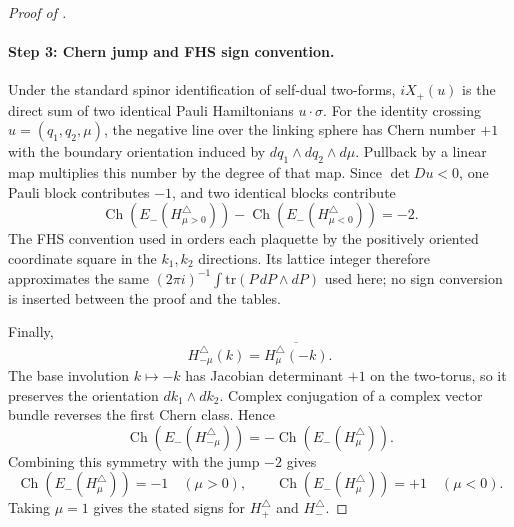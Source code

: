 \documentclass[11pt]{article}
\numberwithin{equation}{section}
\theoremstyle{definition}
\theoremstyle{remark}
\newcommand{\tr}{\mathrm{tr}}
\newcommand{\Ch}{\operatorname{Ch}}
\begin{document}
\begin{proof}[Proof of ]
\paragraph{Step 3: Chern jump and FHS sign convention.}
Under the standard spinor identification of self-dual two-forms, \(iX_+(u)\) is the direct sum of
two identical Pauli Hamiltonians \(u\cdot\sigma\). For the identity crossing
\(u=(q_1,q_2,\mu)\), the negative line over the linking sphere has Chern number \(+1\) with the
boundary orientation induced by \(dq_1\wedge dq_2\wedge d\mu\). Pullback by a linear map multiplies
this number by the degree of that map. Since \(\det Du<0\), one Pauli block contributes \(-1\), and
two identical blocks contribute
\[
\Ch(E_-(H^\triangle_{\mu>0}))-\Ch(E_-(H^\triangle_{\mu<0}))=-2.
\]
The FHS convention used in
 orders each
plaquette by the positively oriented coordinate square in the \(k_1,k_2\) directions. Its lattice
integer therefore approximates the same
\((2\pi i)^{-1}\int\tr(P\,dP\wedge dP)\) used here; no sign conversion is inserted between the
proof and the tables.

Finally,
\[
H^\triangle_{-\mu}(k)=\overline{H^\triangle_{\mu}(-k)}.
\]
The base involution \(k\mapsto-k\) has Jacobian determinant \(+1\) on the two-torus, so it preserves
the orientation \(dk_1\wedge dk_2\). Complex conjugation of a complex vector bundle reverses the
first Chern class. Hence
\[
\Ch(E_-(H^\triangle_{-\mu}))=-\Ch(E_-(H^\triangle_{\mu})).
\]
Combining this symmetry with the jump \(-2\) gives
\[
\Ch(E_-(H^\triangle_{\mu}))=-1\quad(\mu>0),\qquad
\Ch(E_-(H^\triangle_{\mu}))=+1\quad(\mu<0).
\]
Taking \(\mu=1\) gives the stated signs for \(H^\triangle_+\) and \(H^\triangle_-\).
\end{proof}
\end{document}
